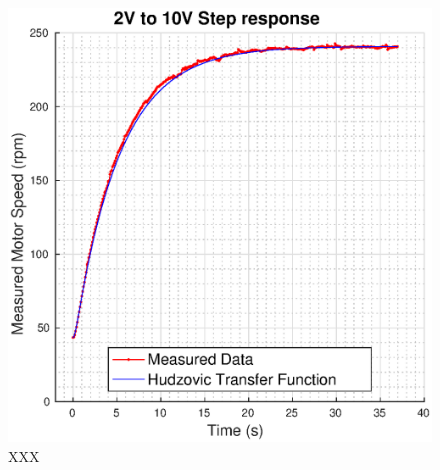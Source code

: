 \begin{figure}
    \centering
    \includegraphics[width=\linewidth]{images/hudzovic}
    \caption{XXX}
\end{figure}

